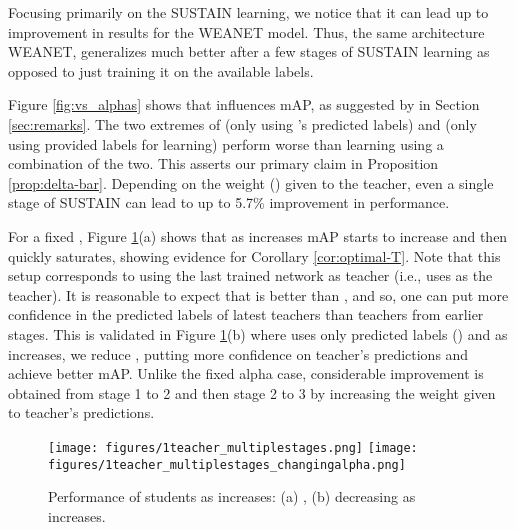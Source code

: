 \documentclass{article}
\begin{document}
Focusing primarily on the SUSTAIN learning, we notice that it can lead up to  improvement in results for the WEANET model. Thus, the same architecture WEANET, generalizes much better after a few stages of SUSTAIN learning as opposed to just training it on the available labels. 


Figure \ref{fig:vs_alphas} shows that  influences mAP, as suggested by in Section \ref{sec:remarks}. The two extremes of  (only using 's predicted labels) and  (only using provided labels  for learning) perform worse than learning using a combination of the two. 
This asserts our primary claim in Proposition \ref{prop:delta-bar}. Depending on the weight () given to the teacher, even a single stage of SUSTAIN can lead to up to 5.7\% improvement in performance. 

For a fixed , Figure \ref{fig:Nt_alpha}(a) shows that as  increases mAP starts to increase and then quickly saturates, showing evidence for Corollary \ref{cor:optimal-T}. 
Note that this setup corresponds to using the last trained network as teacher (i.e.,  uses  as the teacher).
It is reasonable to expect that  is better than , and so, 
one can put more confidence in the predicted labels of latest teachers than teachers from earlier stages. 
This is validated in Figure \ref{fig:Nt_alpha}(b) where  uses only predicted labels () and as  increases, we reduce , 
putting more confidence on teacher's predictions and achieve better mAP.  Unlike the fixed alpha case, considerable improvement is obtained from stage 1 to 2 and then stage 2 to 3 by increasing the weight given to teacher's predictions. 

\begin{figure}[t!]
      \centering
      \texttt{[image: figures/1teacher\_multiplestages.png]} \hspace{-5mm}
      \texttt{[image: figures/1teacher\_multiplestages\_changingalpha.png]}
    \caption{Performance of students as  increases: (a) , (b) decreasing  as  increases.}\label{fig:Nt_alpha}
\end{figure}

\begin{table}[t!]
  \centering
	\caption{ teachers at each stage (weights:  and ).} \label{tab:multipleteach}\end{table}
\end{document}
